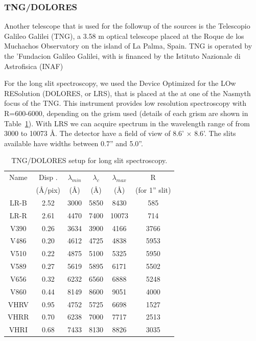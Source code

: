 \subsubsection{TNG/DOLORES}
\label{sec2:tng}

Another telescope that is used for the followup of the sources is the Telescopio Galileo Galilei (TNG), a 3.58 m optical telescope placed at the Roque de los Muchachos Observatory on the island of La Palma, Spain. TNG is operated by the 'Fundacion Galileo Galilei, with is financed by the Istituto Nazionale di Astrofisica (INAF)

For the long slit spectroscopy, we used the Device Optimized for the LOw RESolution (DOLORES, or LRS), that is placed at the at one of the Nasmyth focus of the TNG. This instrument provides low resolution spectroscopy with R=600-6000, depending on the grism used (details of each grism are shown in Table~\ref{tab2:lrs}). With LRS we can acquire spectrum in the wavelength range of from 3000 to 10073 \AA. The detector have a field of view of 8.6' $\times$ 8.6'. The slits available have widths between 0.7'' and 5.0''.

\begin{table}

\caption{TNG/DOLORES setup for long slit spectroscopy.}
\begin{center}
\begin{tabular}{|c|c|c|c|c|c|}
\hline
Name & Disp . & $\lambda_{min}$ & $\lambda_{c}$ & $\lambda_{max}$ & R  \\ 
  & (\AA/pix) & (\AA) & (\AA) & (\AA) & (for 1'' slit)  \\ \hline
LR-B	 & 2.52	 & 3000 & 5850 & 8430 & 585 \\ \hline
LR-R	 & 2.61	 & 4470 & 7400 & 10073 & 714 \\ \hline
V390	 & 0.26 & 3634 & 3900 & 4166 & 3766 \\ \hline
V486	 & 0.20 & 4612 & 4725 & 4838 & 5953 \\ \hline
V510	 & 0.22 & 4875 & 5100 & 5325 & 5950 \\ \hline
V589	 & 0.27 & 5619 & 5895 & 6171 & 5502 \\ \hline
V656	 & 0.32 & 6232 & 6560 & 6888 & 5248 \\ \hline	
V860	 & 0.44 & 8149 & 8600 & 9051 & 4000 \\ \hline
VHRV	 & 0.95 & 4752 & 5725 & 6698 & 1527 \\ \hline	
VHRR	 & 0.70 & 6238 & 7000 & 7717 & 2513 \\ \hline
VHRI	 & 0.68 & 7433 & 8130 & 8826 & 3035 \\ 
\hline
\end{tabular}
\label{tab2:lrs}
\end{center}
\end{table}


